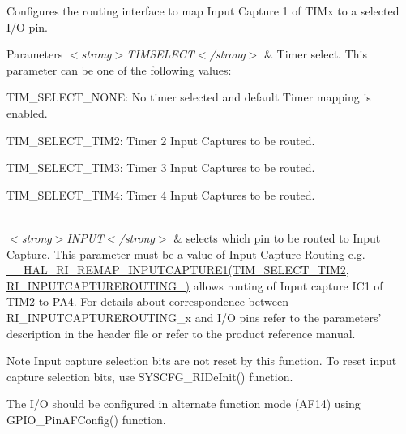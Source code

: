 Configures the routing interface to map Input Capture 1 of T\-I\-Mx to a selected I/\-O pin. 


\begin{DoxyParams}{Parameters}
{\em $<$strong$>$\-T\-I\-M\-S\-E\-L\-E\-C\-T$<$/strong$>$} & Timer select. This parameter can be one of the following values\-: \begin{DoxyItemize}
\item T\-I\-M\-\_\-\-S\-E\-L\-E\-C\-T\-\_\-\-N\-O\-N\-E\-: No timer selected and default Timer mapping is enabled. \item T\-I\-M\-\_\-\-S\-E\-L\-E\-C\-T\-\_\-\-T\-I\-M2\-: Timer 2 Input Captures to be routed. \item T\-I\-M\-\_\-\-S\-E\-L\-E\-C\-T\-\_\-\-T\-I\-M3\-: Timer 3 Input Captures to be routed. \item T\-I\-M\-\_\-\-S\-E\-L\-E\-C\-T\-\_\-\-T\-I\-M4\-: Timer 4 Input Captures to be routed. \end{DoxyItemize}
\\
\hline
{\em $<$strong$>$\-I\-N\-P\-U\-T$<$/strong$>$} & selects which pin to be routed to Input Capture. This parameter must be a value of \hyperlink{group___r_i___input_capture_routing}{Input Capture Routing} e.\-g. \hyperlink{group___r_i___input_caputure_config_gaab9c6ad79238b046d2c4777e4be81b85}{\-\_\-\-\_\-\-H\-A\-L\-\_\-\-R\-I\-\_\-\-R\-E\-M\-A\-P\-\_\-\-I\-N\-P\-U\-T\-C\-A\-P\-T\-U\-R\-E1(\-T\-I\-M\-\_\-\-S\-E\-L\-E\-C\-T\-\_\-\-T\-I\-M2, R\-I\-\_\-\-I\-N\-P\-U\-T\-C\-A\-P\-T\-U\-R\-E\-R\-O\-U\-T\-I\-N\-G\-\_)} allows routing of Input capture I\-C1 of T\-I\-M2 to P\-A4. For details about correspondence between R\-I\-\_\-\-I\-N\-P\-U\-T\-C\-A\-P\-T\-U\-R\-E\-R\-O\-U\-T\-I\-N\-G\-\_\-x and I/\-O pins refer to the parameters' description in the header file or refer to the product reference manual. \\
\hline
\end{DoxyParams}
\begin{DoxyNote}{Note}
Input capture selection bits are not reset by this function. To reset input capture selection bits, use S\-Y\-S\-C\-F\-G\-\_\-\-R\-I\-De\-Init() function. 

The I/\-O should be configured in alternate function mode (A\-F14) using G\-P\-I\-O\-\_\-\-Pin\-A\-F\-Config() function. 
\end{DoxyNote}

